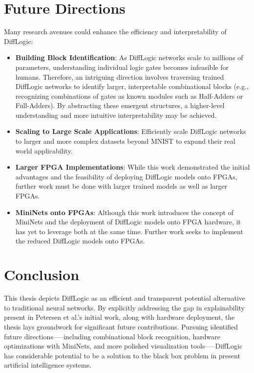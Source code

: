 \section{Future Directions}
\label{sec:future_directions}

Many research avenues could enhance the efficiency and interpretability of DiffLogic:

\begin{itemize}[noitemsep,topsep=0pt]
\item \textbf{Building Block Identification}: As DiffLogic networks scale to millions of parameters, understanding individual logic gates becomes infeasible for humans. Therefore, an intriguing direction involves traversing trained DiffLogic networks to identify larger, interpretable combinational blocks (e.g., recognizing combinations of gates as known modules such as Half-Adders or Full-Adders). By abstracting these emergent structures, a higher-level understanding and more intuitive interpretability may be achieved.

\item \textbf{Scaling to Large Scale Applications}: Efficiently scale DiffLogic networks to larger and more complex datasets beyond MNIST to expand their real world applicability.

\item \textbf{Larger FPGA Implementations}: While this work demonstrated the initial advantages and the feasibility of deploying DiffLogic models onto FPGAs, further work must be done with larger trained models as well as larger FPGAs.

\item \textbf{MiniNets onto FPGAs}: Although this work introduces the concept of MiniNets and the deployment of DiffLogic models onto FPGA hardware, it has yet to leverage both at the same time. Further work seeks to implement the reduced DiffLogic models onto FPGAs.

\end{itemize}

\section{Conclusion}
\label{sec:conclusion}

This thesis depicts DiffLogic as an efficient and transparent potential alternative to traditional neural networks. By explicitly addressing the gap in explainability present in Petersen et al.'s initial work, along with hardware deployment, the thesis lays groundwork for significant future contributions. Pursuing identified future directions—--including combinational block recognition, hardware optimizations with MiniNets, and more polished visualization tools--—DiffLogic has considerable potential to be a solution to the black box problem in present artificial intelligence systems.

